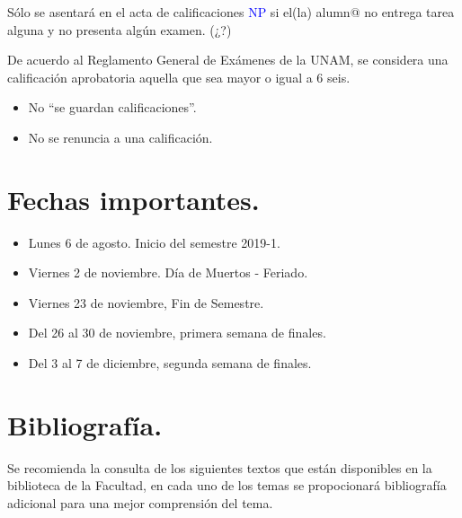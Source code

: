 \documentclass[12pt]{article}
\begin{document}
Sólo se asentará en el acta de calificaciones \textcolor{blue}{NP} si el(la) alumn{@} no entrega tarea alguna y no presenta algún examen. (¿?)
\par
De acuerdo al Reglamento General de Exámenes de la UNAM, se considera una calificación aprobatoria aquella que sea mayor o igual a $6$ seis.
\begin{itemize}
\item No \enquote{se guardan calificaciones}.
\item No se renuncia a una calificación.
\end{itemize}
\section{Fechas importantes.}
\begin{itemize}
\item Lunes 6 de agosto. Inicio del semestre 2019-1.
\item Viernes 2 de noviembre. Día de Muertos - Feriado.
\item Viernes 23 de noviembre, Fin de Semestre.
\item Del 26 al 30 de noviembre, primera semana de finales.
\item Del 3 al 7 de diciembre,  segunda semana de finales.
\end{itemize}
\section{Bibliografía.}
Se recomienda la consulta de los siguientes textos que están disponibles en la biblioteca de la Facultad, en cada uno de los temas se propocionará bibliografía adicional para una mejor comprensión del tema.
\nocite{*}


\end{document}
